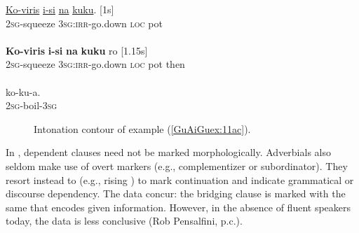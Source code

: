 \documentclass[output=paper]{LSP/langsci}
\begin{document}
\begin{exe}
\ex \label{GuAiGuex:11ac}
\begin{xlist}
\ex \label{GuAiGuex:11a}
\gll \underline{Ko-viris}          \underline{i-si}                 \underline{na}     \underline{kuku}. [1s]\\
\textsc{2sg}-squeeze     \textsc{3sg:irr-}go.down   \textsc{loc}    pot \\
\glt {}\\
\ex \label{GuAiGuex:11b}
\gll \textbf{Ko-viris}          \textbf{i-si}               \textbf{na }    \textbf{kuku}   ro [1.15s] \\
\textsc{2sg}-squeeze     \textsc{3sg:irr-}go.down   \textsc{loc}    pot then\\
\glt {}\\
\ex \label{GuAiGuex:11c}
\gll   ko-ku-a.\\     	       
\textsc{2sg}-boil-\textsc{3sg}\\
\glt {} 
\end{xlist}
\end{exe}

\begin{figure}[ht]
\caption{Intonation contour of example (\ref{GuAiGuex:11ac}). \label{GuFig3}}
\end{figure}


In , dependent clauses need not be marked morphologically. Adverbials also seldom make use of overt  markers (e.g., complementizer or subordinator). They resort instead to  (e.g., rising ) to mark continuation and indicate grammatical or discourse dependency. The  data concur: the bridging clause is marked with the same  that encodes given information. However, in the absence of fluent speakers today, the  data is less conclusive (Rob Pensalfini, p.c.). 
\end{document}
